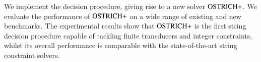 We implement the decision procedure, giving rise to a new solver $\text{OSTRICH+}$. We evaluate the performance of $\text{OSTRICH+}$ on a wide range of existing and new 
benchmarks. The experimental results show that $\text{OSTRICH+}$ is the first string 
decision procedure capable of tackling finite transducers and integer constraints, whilst
its overall performance is comparable with the state-of-the-art string constraint solvers.

